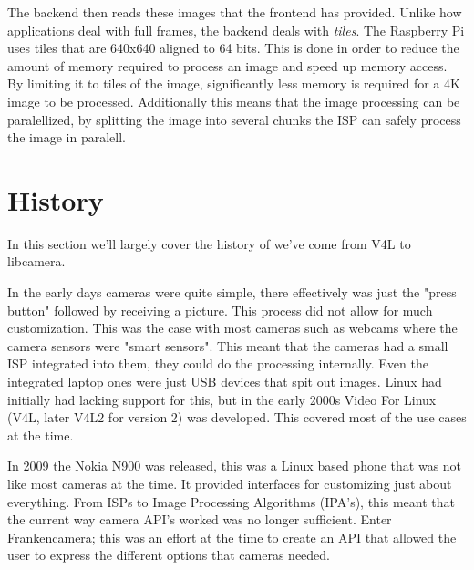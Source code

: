 The backend then reads these images that the frontend has provided. Unlike how
applications deal with full frames, the backend deals with \textit{tiles}. The
Raspberry Pi uses tiles that are 640x640 aligned to 64 bits. This is done in
order to reduce the amount of memory required to process an image and speed up
memory access. By limiting it to tiles of the image, significantly less memory
is required for a 4K image to be processed. Additionally this means that the
image processing can be paralellized, by splitting the image into several
chunks the ISP can safely process the image in paralell.

\section{History}
In this section we'll largely cover the history of we've come from V4L to
libcamera.

In the early days cameras were quite simple, there effectively was just the
"press button" followed by receiving a picture. This process did not allow for
much customization. This was the case with most cameras such as webcams where
the camera sensors were "smart sensors". This meant that the cameras had a small
ISP integrated into them, they could do the processing internally. Even the
integrated laptop ones were just USB devices that spit out images. Linux had
initially had lacking support for this, but in the early 2000s Video For Linux
(V4L, later V4L2 for version 2) was developed. This covered most of the use
cases at the time.

In 2009 the Nokia N900 was released, this was a Linux based phone that was not
like most cameras at the time. It provided interfaces for customizing just
about everything. From ISPs to Image Processing Algorithms (IPA's), this meant
that the current way camera API's worked was no longer sufficient. Enter
Frankencamera\cite{adams2010frankencamera}; this was an effort at the time
to create an API that allowed the user to express the different options that
cameras needed.

